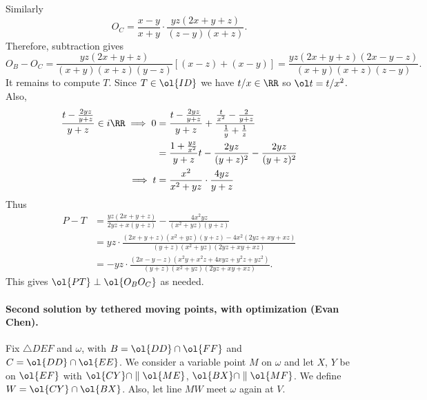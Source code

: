 Similarly
\[ O_C = \frac{x-y}{x+y} \cdot \frac{yz(2x+y+z)}{(z-y)(x+z)}. \]
Therefore, subtraction gives
\[ O_B-O_C
  =
  \frac{yz(2x+y+z)}{(x+y)(x+z)(y-z)}
  \left[ (x-z) + (x-y) \right]
  = \frac{yz(2x+y+z)(2x-y-z)}{(x+y)(x+z)(z-y)}.
\]
It remains to compute $T$.
Since $T \in \ol{ID}$ we have $t/x \in \RR$
so $\ol t = t/x^2$.
Also,
\begin{align*}
  \frac{t - \frac{2yz}{y+z}}{y+z} \in i \RR
  \implies 0 &= \frac{t-\frac{2yz}{y+z}}{y+z}
  + \frac{\frac{t}{x^2}-\frac{2}{y+z}}{\frac1y+\frac1z} \\
  &= \frac{1+\frac{yz}{x^2}}{y+z} t - \frac{2yz}{(y+z)^2} - \frac{2yz}{(y+z)^2} \\
  \implies t &= \frac{x^2}{x^2+yz} \cdot \frac{4yz}{y+z}
\end{align*}
Thus
\begin{align*}
  P-T &= \frac{yz(2x+y+z)}{2yz+x(y+z)} - \frac{4x^2yz}{(x^2+yz)(y+z)} \\
  &= yz \cdot \frac{(2x+y+z)(x^2+yz)(y+z) - 4x^2(2yz+xy+xz)}
    {(y+z)(x^2+yz)(2yz+xy+xz)} \\
  &= -yz \cdot \frac{(2x-y-z)(x^2y+x^2z+4xyz+y^2z+yz^2)}
    {(y+z)(x^2+yz)(2yz+xy+xz)}.
\end{align*}
This gives $\ol{PT} \perp \ol{O_B O_C}$ as needed.

\paragraph{Second solution by tethered moving points, with optimization (Evan Chen).}
Fix $\triangle DEF$ and $\omega$, with $B = \ol{DD} \cap \ol{FF}$
and $C = \ol{DD} \cap \ol{EE}$.
We consider a variable point $M$ on $\omega$
and let $X$, $Y$ be on $\ol{EF}$ with
$\ol{CY} \cap \parallel \ol{ME}$, $\ol{BX} \cap \parallel \ol{MF}$.
We define $W = \ol{CY} \cap \ol{BX}$.
Also, let line $MW$ meet $\omega$ again at $V$.

